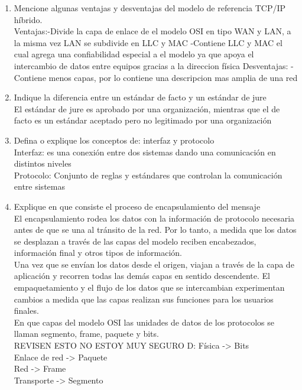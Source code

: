 \documentclass{udparticle}
\begin{document}
\begin{enumerate}
\item Mencione algunas ventajas y desventajas del modelo de referencia TCP/IP híbrido.\\
    Ventajas:-Divide la capa de enlace de el modelo OSI en tipo WAN y LAN, a la misma vez LAN se subdivide en LLC y MAC
             -Contiene LLC y MAC el cual agrega una confiabilidad especial a el modelo ya que apoya el intercambio de datos
              entre equipos gracias a la direccion física
    Desventajas: -Contiene menos capas, por lo contiene una descripcion mas amplia de una red 
\item Indique la diferencia entre un estándar de  facto y un estándar de  jure\\
    El estándar de jure es aprobado por una organización, mientras que el de facto es un estándar aceptado pero 
    no legitimado por una organización\\
\item Defina o explique los conceptos de: interfaz y protocolo\\
    Interfaz: es una conexión entre dos sistemas dando una comunicación en distintos niveles\\
    Protocolo: Conjunto de reglas y estándares que controlan la comunicación entre sistemas\\
\item Explique en que consiste el proceso de encapsulamiento del mensaje\\
    El encapsulamiento rodea los datos con la información de protocolo necesaria antes de que se una al tránsito de la red.
    Por lo tanto, a medida que los datos se desplazan a través de las capas del modelo reciben encabezados, información final y otros
    tipos de información.\\
    Una vez que se envían los datos desde el origen, viajan a través de la capa de aplicación y recorren todas las demás capas en 
    sentido descendente. El empaquetamiento y el flujo de los datos que se intercambian experimentan cambios a medida que las capas 
    realizan sus funciones para los usuarios finales.\\

\itemIndique En que capas del modelo OSI las unidades de datos de los protocolos se llaman segmento,
frame, paquete y bits.\\
    REVISEN ESTO NO ESTOY MUY SEGURO D:
  Física -> Bits\\
  Enlace de red -> Paquete\\
  Red -> Frame\\
  Transporte -> Segmento\\


\end{enumerate}
\end{document}
